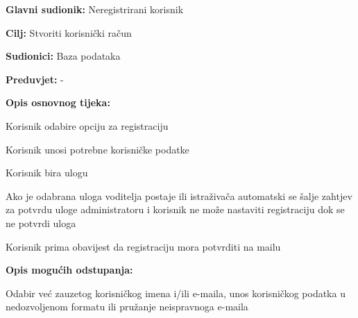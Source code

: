 					\noindent {}
					\begin{packed_item}
	
						\item \textbf{Glavni sudionik: }Neregistrirani korisnik
						\item  \textbf{Cilj:} Stvoriti korisnički račun 
						\item  \textbf{Sudionici:} Baza podataka
						\item  \textbf{Preduvjet:} -
						\item  \textbf{Opis osnovnog tijeka:} 
						
						
						\item[] \begin{packed_enum}
	
							\item Korisnik odabire opciju za registraciju							
							\item Korisnik unosi potrebne korisničke podatke
							\item Korisnik bira ulogu
							\item Ako je odabrana uloga voditelja postaje ili istraživača automatski se šalje zahtjev za potvrdu uloge administratoru i korisnik ne može nastaviti registraciju dok se ne potvrdi uloga
							\item Korisnik prima obavijest da registraciju mora potvrditi na mailu
							
						\end{packed_enum}
						
						\item  \textbf{Opis mogućih odstupanja:}
						
						\item[] \begin{packed_item}
	
							\item[2.a] Odabir već zauzetog korisničkog imena i/ili e-maila, unos korisničkog
							podatka u nedozvoljenom formatu ili pružanje neispravnoga e-maila
							
							\item[] \begin{packed_enum}
								

\end{packed_enum}
\end{packed_item}
\end{packed_item}
